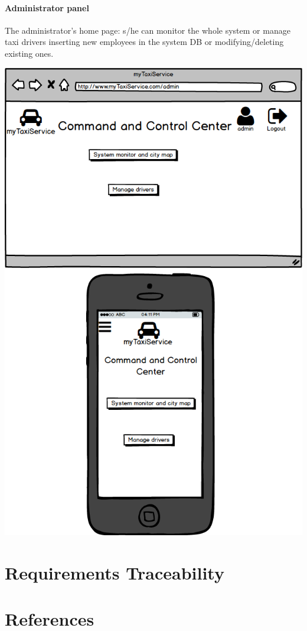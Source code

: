 \documentclass[a4paper,11pt]{report} %
\begin{document}
	\paragraph{Administrator panel} The administrator's home page: s/he can monitor the whole system or manage taxi drivers inserting new employees in the system DB or modifying/deleting existing ones.
	\begin{center}
		\includegraphics[width=0.9\linewidth]{Pictures/AdminPage}
	\end{center}
	\pagebreak	
	
	\section{Requirements Traceability}
	
	\section{References}
	
\end{document}

